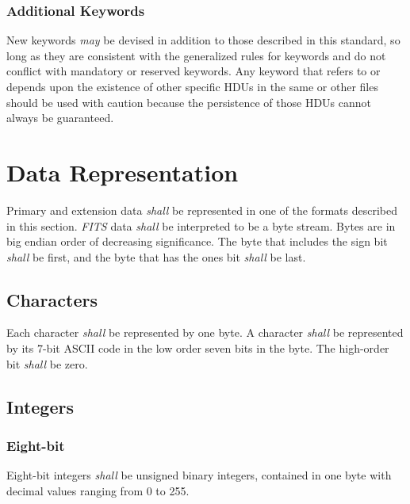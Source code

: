 \documentclass[11pt,makeidx]{book}     %
\begin{document}
   \subsection{Additional Keywords}
  
   New keywords
   {\em may} be devised in addition to those
   described in this standard, so long as they are consistent
   with the generalized rules for keywords and do not conflict
   with mandatory or reserved keywords.
   Any keyword that refers to or depends upon the existence of other
   specific HDUs in the same or other files should
   be used with caution because the persistence of those HDUs cannot always
   be guaranteed.


  \chapter{Data Representation}
   \label{s:Drep}
  Primary and extension data {\em shall} be 
  represented in one of the formats
  described in this section.  {\em FITS\/} data {\em shall} be interpreted to 
  be a byte stream.  Bytes are in big endian 
  order
  of decreasing significance.
  The byte that includes the sign bit
  {\em shall} be first, and the byte 
  that has the ones bit {\em shall} be last.   
  
  \section{Characters}
   Each character {\em shall} be represented by 
   one byte.  A character
   {\em shall} be represented by its 7-bit ASCII \cite{ansi77} code in the low order 
   seven bits in the byte.  The high-order bit {\em shall} be zero.
  
  \section{Integers}
  
   \subsection{Eight-bit}
   Eight-bit integers {\em shall} be unsigned binary integers, contained 
   in one byte with decimal values ranging from 0 to 255.
  
\end{document}
